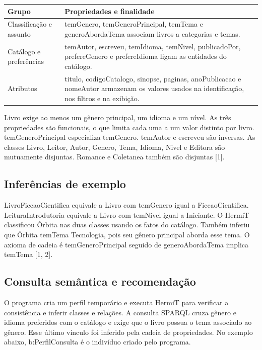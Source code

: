 \documentclass[12pt,a4paper]{article}
\begin{document}
\begin{table}[htbp]
    \centering
    \begin{tabular}{>{\raggedright\arraybackslash}p{4.5cm} >{\raggedright\arraybackslash}p{10.3cm}}
        \toprule
        \textbf{Grupo} & \textbf{Propriedades e finalidade} \\
        \midrule
        Classificação e assunto & temGenero, temGeneroPrincipal, temTema e generoAbordaTema associam livros a categorias e temas. \\
        \addlinespace
        Catálogo e preferências & temAutor, escreveu, temIdioma, temNivel, publicadoPor, prefereGenero e prefereIdioma ligam as entidades do catálogo. \\
        \addlinespace
        Atributos & titulo, codigoCatalogo, sinopse, paginas, anoPublicacao e nomeAutor armazenam os valores usados na identificação, nos filtros e na exibição. \\
        \bottomrule
    \end{tabular}
\end{table}

Livro exige ao menos um gênero principal, um idioma e um nível. As três propriedades são funcionais, o que limita cada uma a um valor distinto por livro. temGeneroPrincipal especializa temGenero. temAutor e escreveu são inversas. As classes Livro, Leitor, Autor, Genero, Tema, Idioma, Nivel e Editora são mutuamente disjuntas. Romance e Coletanea também são disjuntas [1].

\subsection{Inferências de exemplo}

LivroFiccaoCientifica equivale a Livro com temGenero igual a FiccaoCientifica. LeituraIntrodutoria equivale a Livro com temNivel igual a Iniciante. O HermiT classificou Órbita nas duas classes usando os fatos do catálogo. Também inferiu que Órbita temTema Tecnologia, pois seu gênero principal aborda esse tema. O axioma de cadeia é temGeneroPrincipal seguido de generoAbordaTema implica temTema [1, 2].

\subsection{Consulta semântica e recomendação}

O programa cria um perfil temporário e executa HermiT para verificar a consistência e inferir classes e relações. A consulta SPARQL cruza gênero e idioma preferidos com o catálogo e exige que o livro possua o tema associado ao gênero. Esse último vínculo foi inferido pela cadeia de propriedades. No exemplo abaixo, b:PerfilConsulta é o indivíduo criado pelo programa.
\end{document}
